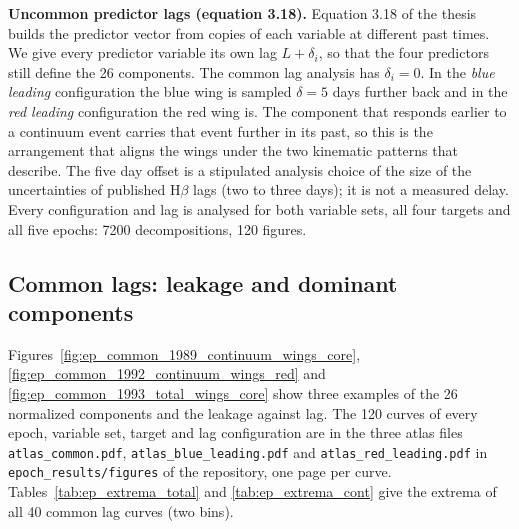 \textbf{Uncommon predictor lags (equation 3.18).} Equation 3.18 of the thesis
builds the predictor vector from copies of each variable at different past
times. We give every predictor variable its own lag $L+\delta_i$, so that the four
predictors still define the 26 components. The common lag analysis has
$\delta_i=0$. In the \emph{blue leading} configuration the blue wing is sampled
$\delta=5$ days further back and in the \emph{red leading} configuration the red
wing is. The component that responds earlier to a continuum event carries that
event further in its past, so this is the arrangement that aligns the wings
under the two kinematic patterns that \citet{Xi2025} describe. The five day
offset is a stipulated analysis choice of the size of the uncertainties of
published H$\beta$ lags (two to three days); it is not a measured delay. Every
configuration and lag is analysed for both variable sets, all four targets and all
five epochs: 7200 decompositions, 120 figures.

\subsection{Common lags: leakage and dominant components}

Figures~\ref{fig:ep_common_1989_continuum_wings_core},
\ref{fig:ep_common_1992_continuum_wings_red} and \ref{fig:ep_common_1993_total_wings_core}
show three examples of the 26 normalized components and the leakage against lag. The 120
curves of every epoch, variable set, target and lag configuration are in the three atlas
files \texttt{atlas\_common.pdf}, \texttt{atlas\_blue\_leading.pdf} and
\texttt{atlas\_red\_leading.pdf} in \texttt{epoch\_results/figures} of the
repository, one page per curve. Tables~\ref{tab:ep_extrema_total} and
\ref{tab:ep_extrema_cont} give the extrema of all 40 common lag curves (two bins).



\begin{SURDtable}
\centering
\caption{Variable set total, blue, core and red H$\beta$ with common lags and two
bins. Leakage minimum and maximum, with the lag in days in parentheses, followed by
the largest unique, redundant and synergistic component over lags 1 to 30 d, with its
normalized value and lag. H, B, C and R denote the total, blue, core and red series.
The maxima are descriptive and have no null calibration or lag uncertainty.}
\label{tab:ep_extrema_total}
\footnotesize
\setlength{\tabcolsep}{3pt}

\end{SURDtable}

